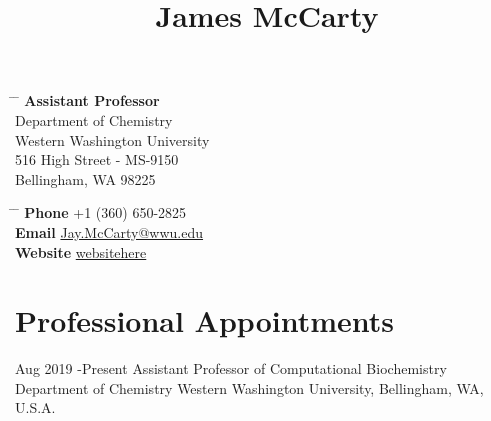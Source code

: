 \documentclass[10pt]{article} %
\begin{document}

\title{James McCarty} %


\parbox{0.5\textwidth}{ %
\begin{tabbing} %
\hspace{3cm} \= \hspace{4cm} \= \kill %
{\bf Assistant Professor} \\
Department of Chemistry\\ %
Western Washington University \\
516 High Street - MS-9150\\ %
Bellingham, WA 98225 \\
\end{tabbing}}
\hfill %
\parbox{0.5\textwidth}{ %
\begin{tabbing} %
\hspace{3cm} \= \hspace{4cm} \= \kill %
{\bf Phone} \> +1 (360) 650-2825 \\ %
{\bf Email} \> \href{mailto:Jay.McCarty@wwu.edu}{Jay.McCarty@wwu.edu} \\ %
{\bf Website} \> \href{https://websitehere}{websitehere} \\
\end{tabbing}}


\section{Professional Appointments}

\job
{Aug 2019 -}{Present}
{Assistant Professor of Computational Biochemistry}
{Department of Chemistry}
{Western Washington University, Bellingham, WA, U.S.A.}
\end{document}
